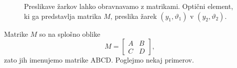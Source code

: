 \begin{figure}[h]
\centering
\centering
\def\svgwidth{100truemm}

\caption{Preslikave žarkov lahko obravnavamo
z matrikami. Optični element, ki ga predstavlja matrika $M$, 
preslika žarek $(y_{1},\vartheta_{1})$
v $(y_{2},\vartheta_{2})$.}
\label{fig:K-matricni-obravnavi}
\end{figure}

Matrike $M$ so na splošno oblike
\begin{equation}
M = \left[\begin{array}{cc}
A & B\\
C & D
\end{array}\right],
\label{eq:ABCDdef}
\end{equation}
zato jih imenujemo matrike ABCD. Poglejmo nekaj primerov. 

